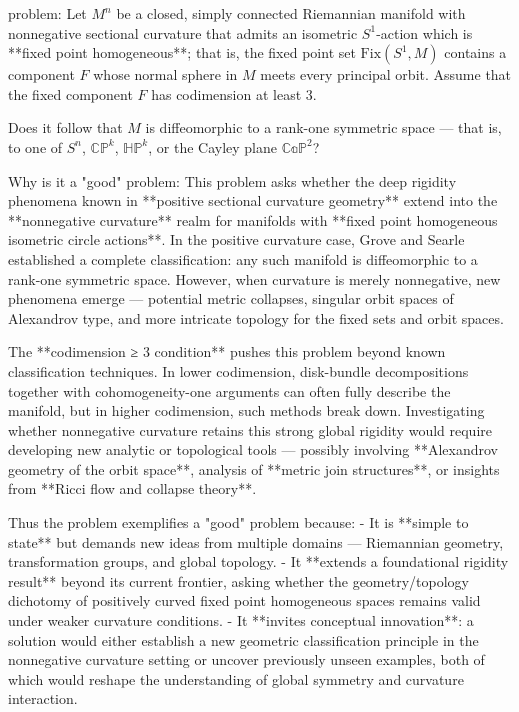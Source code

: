 problem:  
Let \( M^n \) be a closed, simply connected Riemannian manifold with nonnegative sectional curvature that admits an isometric \( S^1 \)-action which is **fixed point homogeneous**; that is, the fixed point set \(\mathrm{Fix}(S^1, M)\) contains a component \(F\) whose normal sphere in \(M\) meets every principal orbit. Assume that the fixed component \(F\) has codimension at least \(3\).  

Does it follow that \(M\) is diffeomorphic to a rank-one symmetric space — that is, to one of \(S^n\), \(\mathbb{CP}^k\), \(\mathbb{HP}^k\), or the Cayley plane \(\mathbb{CaP}^2\)?  

Why is it a "good" problem:  
This problem asks whether the deep rigidity phenomena known in **positive sectional curvature geometry** extend into the **nonnegative curvature** realm for manifolds with **fixed point homogeneous isometric circle actions**. In the positive curvature case, Grove and Searle established a complete classification: any such manifold is diffeomorphic to a rank-one symmetric space. However, when curvature is merely nonnegative, new phenomena emerge — potential metric collapses, singular orbit spaces of Alexandrov type, and more intricate topology for the fixed sets and orbit spaces.  

The **codimension ≥ 3 condition** pushes this problem beyond known classification techniques. In lower codimension, disk-bundle decompositions together with cohomogeneity-one arguments can often fully describe the manifold, but in higher codimension, such methods break down. Investigating whether nonnegative curvature retains this strong global rigidity would require developing new analytic or topological tools — possibly involving **Alexandrov geometry of the orbit space**, analysis of **metric join structures**, or insights from **Ricci flow and collapse theory**.  

Thus the problem exemplifies a "good" problem because:  
- It is **simple to state** but demands new ideas from multiple domains — Riemannian geometry, transformation groups, and global topology.  
- It **extends a foundational rigidity result** beyond its current frontier, asking whether the geometry/topology dichotomy of positively curved fixed point homogeneous spaces remains valid under weaker curvature conditions.  
- It **invites conceptual innovation**: a solution would either establish a new geometric classification principle in the nonnegative curvature setting or uncover previously unseen examples, both of which would reshape the understanding of global symmetry and curvature interaction.